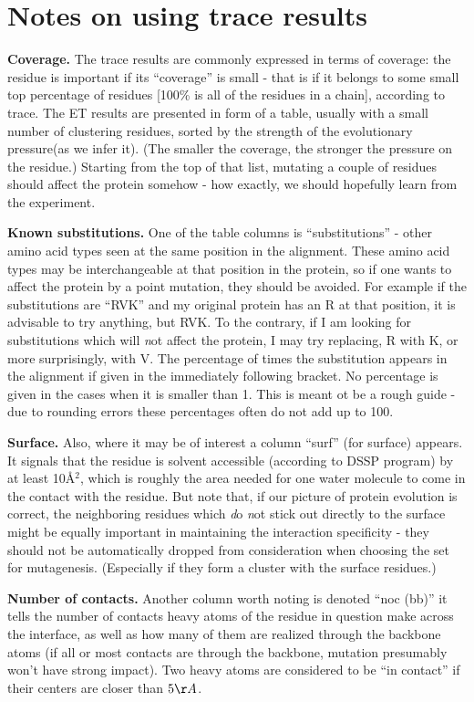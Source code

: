 \section{Notes on using trace results}

 {\bf Coverage.} The trace  results are commonly expressed in terms of coverage: the residue is
important if its ``coverage'' is small - that is if it belongs to some small top percentage of residues [100\% is
 all of the residues in a chain], according to trace.
The ET results are presented  in form of a table, usually with a small number of 
clustering residues, sorted by the strength of the evolutionary pressure(as we infer it).
(The smaller the coverage, the stronger the pressure on the residue.) Starting from the top of that list,
mutating a couple of residues should affect the protein somehow -  how exactly, we should hopefully learn from
the experiment.

 {\bf Known substitutions.} One of the table columns is ``substitutions''
- other amino acid types seen at the same position in the alignment. These amino acid types may be interchangeable
at that position in the protein, so if one wants to affect the protein by a point mutation, they should be avoided.
For example if the substitutions are ``RVK'' and my original protein has an R at that position, it is advisable to
try anything, but RVK. To the contrary, if I am looking for substitutions which will {\emph not}  affect the protein,
I may try replacing, R with K, or more surprisingly, with V. The percentage of times the substitution appears in the
alignment if given in the immediately following bracket. No percentage is given in the cases when it is smaller than 1.
This is meant ot be a rough guide - due to rounding errors these percentages often do not add up to 100.

{\bf Surface.} Also, where it may be of interest a column ``surf'' (for surface) appears. It signals that the
residue is solvent accessible (according to DSSP program) by at least 10\AA$^2$, 
which is roughly the area  needed for one water molecule
to come in the contact with the residue. But note that, if our picture of protein evolution is
correct, the neighboring residues which {\emph do \emph not} stick out directly to the surface might be equally important
in maintaining the interaction specificity - they should not be automatically dropped from consideration when
choosing the set for mutagenesis. (Especially if they form  a cluster with the surface residues.)

{\bf Number of contacts.} Another column worth noting is denoted ``noc (bb)'' it tells the number of contacts heavy atoms
of the residue in question make across the interface, as well as  how many of them are realized through
the backbone atoms (if all or most contacts are through the backbone, mutation presumably won't have strong impact).
Two heavy atoms are considered to be ``in contact'' if their centers are closer than $5\AA$.

